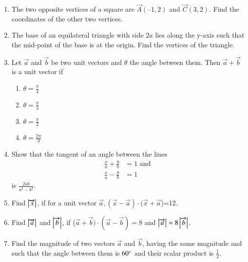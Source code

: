 \begin{enumerate}[label=\thesubsection.\arabic*,ref=\thesubsection.\theenumi]
\item The two opposite vertices of a square are $\vec{A}(–1, 2)$  and $ \vec{C}(3, 2)$. Find the coordinates of the other two vertices.
\\
\solution
	
\item The base of an equilateral triangle with side $2a$ lies along the y-axis such that the mid-point of the base is at the origin. Find the vertices of the triangle.
\label{chapters/11/10/1/2}
	\\
	\solution 

\item Let $\vec{a}$ and $\vec{b}$ be two unit vectors and $\theta$ the angle between them. Then $\vec{a}+\vec{b}$ is a unit vector if
	\begin{enumerate}
			\itemsep2pt
		\item $\theta = \frac{\pi}{4}$
		\item $\theta = \frac{\pi}{3}$
		\item $\theta = \frac{\pi}{2}$
		\item $\theta = \frac{2\pi}{3}$
			\end{enumerate}
\solution

\item Show that the tangent of an angle between the lines 
\begin{align}
	\frac{x}{a}+\frac{y}{b}&=1 \text{ and }
	\\
	\frac{x}{a}-\frac{y}{b}&=1 
\end{align}
is $\frac{2ab}{a^2-b^2}$.
\item Find $\left\vert\overrightarrow {x}\right\vert$, if for a unit vector $\overrightarrow {a}, (\overrightarrow {x}-\overrightarrow {a})\cdot (\overrightarrow {x}+\overrightarrow {a}$)=12.
	\\
\solution 
		
\item Find $\left\vert\overrightarrow {a}\right\vert$ and $\left\vert\overrightarrow {b}\right\vert$, if ($\overrightarrow {a}+\overrightarrow {b})\cdot (\overrightarrow {a}-\overrightarrow {b})=8$ and $\left\vert\overrightarrow {a}\right\vert=8\left\vert\overrightarrow {b}\right\vert$.
	\\
	\solution
		
\item Find the magnitude of two vectors $\overrightarrow {a}$ and $\overrightarrow {b}$, having the same magnitude and such that the angle between them is $60\degree$ and their scalar product is $\frac{1}{2}$.

\end{enumerate}
